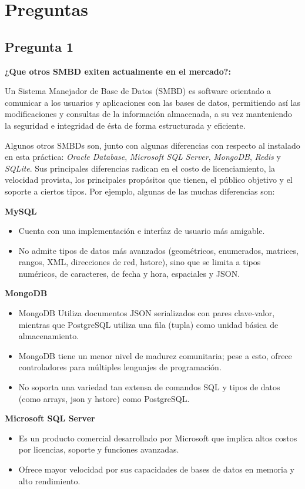\section{Preguntas}


\subsection*{Pregunta 1}
\textbf{¿Que otros SMBD exiten actualmente en el mercado?:}

Un Sistema Manejador de Base de Datos (SMBD) es software orientado a comunicar a los usuarios y aplicaciones con las bases de datos, permitiendo así las modificaciones y consultas de la información almacenada, a su vez manteniendo la seguridad e integridad de ésta de forma estructurada y eficiente. 

Algunos otros SMBDs son, junto con algunas diferencias con respecto al instalado en esta práctica: \textit{Oracle Database}, \textit{Microsoft SQL Server}, \textit{MongoDB}, \textit{Redis} y \textit{SQLite}. Sus principales diferencias radican en el costo de licenciamiento, la velocidad provista, los principales propósitos que tienen, el público objetivo y el soporte a ciertos tipos. Por ejemplo, algunas de las muchas diferencias son:

\textbf{MySQL}
\begin{itemize}
        \item Cuenta con una implementación e interfaz de usuario más amigable.
    \item No admite tipos de datos más avanzados (geométricos, enumerados, matrices, rangos, XML, direcciones de red, hstore), sino que se limita a tipos numéricos, de caracteres, de fecha y hora, espaciales y JSON.
\end{itemize}
\textbf{MongoDB}
\begin{itemize}
    \item MongoDB Utiliza documentos JSON serializados con pares clave-valor, mientras que PostgreSQL utiliza una fila (tupla) como unidad básica de almacenamiento.
    \item MongoDB tiene un menor nivel de madurez comunitaria; pese a esto, ofrece controladores para múltiples lenguajes de programación.
    \item No soporta una variedad tan extensa de comandos SQL y tipos de datos (como arrays, json y hstore) como PostgreSQL.
\end{itemize}
\textbf{Microsoft SQL Server}
\begin{itemize}
    \item Es un producto comercial desarrollado por Microsoft que implica altos costos por licencias, soporte y funciones avanzadas.
    \item Ofrece mayor velocidad por sus capacidades de bases de datos en memoria y alto rendimiento.
\end{itemize}
\newpage
